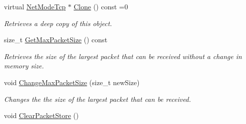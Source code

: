 \begin{DoxyCompactItemize}
virtual \hyperlink{class_net_mode_tcp}{NetModeTcp} $\ast$ \hyperlink{class_net_mode_tcp_a00d88706d67bfb42eeab24fe9dd0d563}{Clone} () const =0
\begin{DoxyCompactList}\small\item\em Retrieves a deep copy of this object. \item\end{DoxyCompactList}\item 
size\_\-t \hyperlink{class_net_mode_tcp_a51f8430ad742bc21f4fbceb4101a6414}{GetMaxPacketSize} () const 
\begin{DoxyCompactList}\small\item\em Retrieves the size of the largest packet that can be received without a change in memory size. \item\end{DoxyCompactList}\item 
void \hyperlink{class_net_mode_tcp_a875a5427b917d225cdbe7798619c6a07}{ChangeMaxPacketSize} (size\_\-t newSize)
\begin{DoxyCompactList}\small\item\em Changes the the size of the largest packet that can be received. \item\end{DoxyCompactList}\item 
\hypertarget{class_net_mode_tcp_adee8f5163c002823728135079de631d8}{
void \hyperlink{class_net_mode_tcp_adee8f5163c002823728135079de631d8}{ClearPacketStore} ()}
\label{class_net_mode_tcp_adee8f5163c002823728135079de631d8}


\end{DoxyCompactItemize}
